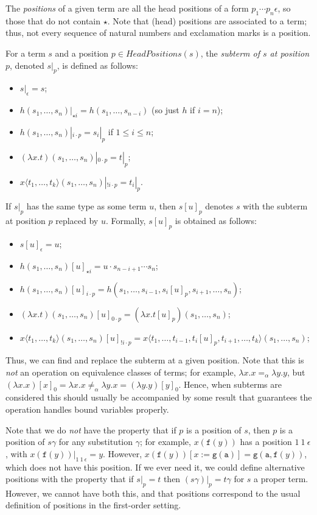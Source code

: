 \documentclass{lmcs}
\theoremstyle{theorem}\newtheorem{theorem}{Theorem}
\theoremstyle{theorem}\newtheorem{lemma}[theorem]{Lemma}
\theoremstyle{theorem}\newtheorem{corollary}[theorem]{Corollary}
\theoremstyle{definition}\newtheorem{definition}[theorem]{Definition}
\theoremstyle{definition}\newtheorem{example}[theorem]{Example}
\newcommand{\HeadPositions}{\mathit{HeadPositions}}
\newcommand{\identifier}[1]{\mathtt{#1}}
\newcommand{\afun}{\identifier{f}}
\newcommand{\bfun}{\identifier{g}}
\newcommand{\avar}{x}
\newcommand{\abs}[2]{\lambda #1.#2}
\newcommand{\meta}[2]{#1\langle#2\rangle}
\begin{document}
The \emph{positions} of a given term are all the head positions of a form $p_1 \cdots p_n \epsilon$,
so those that do not contain $\star$.
Note that (head) positions are associated to a term; thus, not every sequence of natural numbers
and exclamation marks is a position.

For a term $s$ and a position $p \in \HeadPositions(s)$, the \emph{subterm of $s$ at position $p$},
denoted $s|_p$, is defined as follows:
\begin{itemize}
\item $s|_\epsilon = s$;
\item $h(s_1,\dots,s_n)|_{\star i} = h(s_1,\dots,s_{n-i})$ (so just $h$ if $i = n$);
\item $h(s_1,\dots,s_n)|_{i \cdot p} = s_i|_p$ if $1 \leq i \leq n$;
\item $(\abs{\avar}{t})(s_1,\dots,s_n)|_{0 \cdot p} = t|_p$;
\item $\meta{\avar}{t_1,\dots,t_k}(s_1,\dots,s_n)|_{!i \cdot p} = t_i|_p$.
\end{itemize}

If $s|_p$ has the same type as some term $u$, then $s[u]_p$ denotes $s$ with the subterm at position
$p$ replaced by $u$.  Formally, $s[u]_p$ is obtained as follows:
\begin{itemize}
\item $s[u]_\epsilon = u$;
\item $h(s_1,\dots,s_n)[u]_{\star i} = u \cdot s_{n-i+1} \cdots s_n$;
\item $h(s_1,\dots,s_n)[u]_{i \cdot p} = h(s_1,\dots,s_{i-1},s_i[u]_p,s_{i+1},\dots,s_n)$;
\item $(\abs{\avar}{t})(s_1,\dots,s_n)[u]_{0 \cdot p} = (\abs{\avar}{t[u]_p})(s_1,\dots,s_n)$;
\item $\meta{x}{t_1,\dots,t_k}(s_1,\dots,s_n)[u]_{!i \cdot p} = \meta{x}{t_1,\dots,t_{i-1},t_i[u]_p,t_{i+1},\dots,t_k}(s_1,\dots,s_n)$;
\end{itemize}
Thus, we can find and replace the subterm at a given position.
Note that this is \emph{not} an operation on equivalence classes of terms; for example,
$\abs{x}{x} =_\alpha \abs{y}{y}$, but $(\abs{x}{x})[x]_0 = \abs{x}{x} \not =_\alpha
\abs{y}{x} = (\abs{y}{y})[y]_0$.  Hence, when subterms are considered this should usually be
accompanied by some result that guarantees the operation handles bound variables properly.

Note that we do \emph{not} have the property that if $p$ is a position of $s$, then $p$ is a
position of $s\gamma$ for any substitution $\gamma$; for example, $x(\afun(y))$ has a position
$1\ 1\ \epsilon$, with $x(\afun(y))|_{1\ 1\ \epsilon} = y$.  However,
$x(\afun(y))[x:=\bfun(\identifier{a})] = \bfun(\identifier{a},\afun(y))$, which does not have this
position.  If we ever need it, we could define alternative positions with the property that
if $s|_p = t$ then $(s\gamma)|_p = t\gamma$ for $s$ a proper term.  However, we cannot have both
this, and that positions correspond to the usual definition of positions in the first-order setting.
\end{document}
